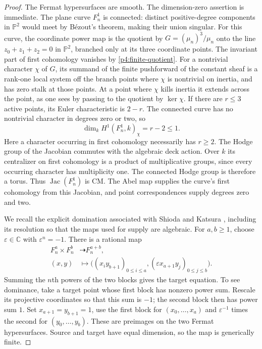 \documentclass[11pt]{article}
\newcommand{\C}{\mathbb C}
\theoremstyle{plain}
\theoremstyle{definition}
\theoremstyle{remark}
\numberwithin{equation}{section}
\begin{document}
\begin{proof}
The Fermat hypersurfaces are smooth.  The dimension-zero assertion
is immediate.  The plane curve $F_n^1$ is connected: distinct
positive-degree components in $\mathbb P^2$ would meet by
B\'ezout's theorem, making their union singular.  For this curve,
the coordinate power map
is the quotient by
$G=(\mu_n)^3/\mu_n$ onto the line
$z_0+z_1+z_2=0$ in $\mathbb P^2$, branched only at its three
coordinate points.  The invariant part of first cohomology vanishes
by \eqref{p4:finite-quotient}.  For a nontrivial character
$\chi$ of $G$, its summand of the finite pushforward of the
constant sheaf is a rank-one local system off the branch points
where $\chi$ is nontrivial on inertia, and has zero stalk at
those points.  At a point where $\chi$ kills inertia it extends
across the point, as one sees by passing to the quotient by
$\ker\chi$.  If there are $r\le3$ active points, its Euler
characteristic is $2-r$.  The connected curve has no nontrivial
character in degrees zero or two, so
\[
 \dim_k H^1(F_n^1,k)_\chi=r-2\le1.
\]
Here a character occurring in first cohomology necessarily has
$r\ge2$.  The Hodge group of the Jacobian commutes with the
algebraic deck action.  Over $k$ its centralizer on first
cohomology is a product of multiplicative groups, since every
occurring character has multiplicity one.  The connected Hodge
group is therefore a torus.  Thus $\operatorname{Jac}(F_n^1)$
is CM.  The Abel map supplies the curve's first cohomology from
this Jacobian, and point correspondences supply degrees zero and
two.

We recall the explicit domination associated with Shioda and
Katsura \cite{SK}, including its resolution so that
the maps used for supply are algebraic.  For $a,b\ge1$, choose
$\varepsilon\in\C$ with $\varepsilon^n=-1$.  There is a
rational map
\begin{equation}
 \label{p4:eq:fermat-map}
 \begin{split}
 F_n^a\times F_n^b&\dashrightarrow F_n^{a+b},\\
 (x,y)&\longmapsto
 \bigl((x_i y_{b+1})_{0\le i\le a},
       (\varepsilon x_{a+1}y_j)_{0\le j\le b}\bigr).
 \end{split}
\end{equation}
Summing the $n$th powers of the two blocks gives the target
equation.  To see dominance, take a target point whose first
block has nonzero power sum.  Rescale its projective coordinates
so that this sum is $-1$; the second block then has power sum
$1$.  Set $x_{a+1}=y_{b+1}=1$, use the first block for
$(x_0,\ldots,x_a)$ and $\varepsilon^{-1}$ times the second
for $(y_0,\ldots,y_b)$.  These are preimages on the two Fermat
hypersurfaces.  Source and target have equal dimension, so the
map is generically finite.


\end{proof}
\end{document}

